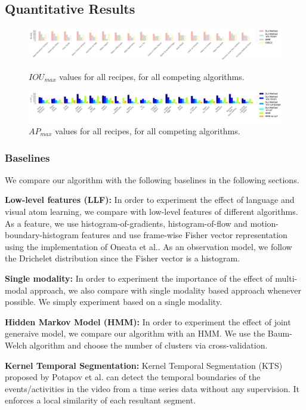 \subsection{Quantitative Results}
\begin{figure}[t]
  \includegraphics[width=\textwidth]{miou}
  \caption{$IOU_{max}$ values for all recipes, for all competing algorithms.}
  \label{mIOU}
\includegraphics[width=\textwidth]{mmap}
\caption{$AP_{max}$ values for all recipes, for all competing algorithms.}
\label{mmAP}
\end{figure}

\subsubsection{Baselines}
We compare our algorithm with the following baselines in the following sections.

\noindent\textbf{Low-level features (LLF):}
In order to experiment the effect of language and visual atom learning, we compare with low-level features of different algorithms. As a feature, we use histogram-of-gradients, histogram-of-flow and motion-boundary-histogram features and use frame-wise Fisher vector representation using the implementation of Oneata et al.\cite{fastLaptev}. As an observation model, we follow the Drichelet distribution since the Fisher vector is a histogram.

\noindent\textbf{Single modality:}
In order to experiment the importance of the effect of multi-modal approach, we also compare with single modality based approach whenever possible. We simply experiment based on a single modality.

\noindent\textbf{Hidden Markov Model (HMM):}
In order to experiment the effect of joint generaive model, we compare our algorithm with an HMM. We use the Baum-Welch algorithm\cite{rabiner} and choose the number of clusters via cross-validation.


\noindent\textbf{Kernel Temporal Segmentation\cite{potapov2014category}:}
Kernel Temporal Segmentation (KTS) proposed by Potapov et al.\cite{potapov2014category} can detect the temporal boundaries of the events/activities in the video from a time series data without any supervision. It enforces a local similarity of each resultant segment.

